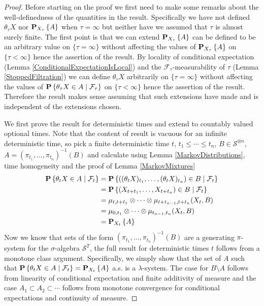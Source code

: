 \begin{proof}
Before starting on the proof we first need to make some remarks about
the well-definedness of the quantities in the result.  Specifically we
have not defined $\theta_\tau X$ nor $\sprobability{A}{X_\tau}$ when $\tau = \infty$ but neither have
we assumed that $\tau$ is almost surely finite.  The first point is that we
can extend $\sprobability{A}{X_\tau}$ can be defined to be an
arbitrary value on $\lbrace \tau = \infty \rbrace$ without affecting
the values of $\sprobability{A}{X_\tau}$ on $\lbrace \tau < \infty
\rbrace$ hence the assertion of the result.  By locality of
conditional expectation (Lemma \ref{ConditionalExpectationIsLocal})
and the $\mathcal{F}_\tau$-measurability of
$\tau$ (Lemma
\ref{StoppedFiltration}) we can define $\theta_\tau X$ arbitrarily on $\lbrace \tau =
\infty \rbrace$ without affecting the values of
$\cprobability{\mathcal{F}_\tau}{\theta_\tau X \in A}$ on $\lbrace \tau < \infty
\rbrace$ hence the assertion of the result.  Therefore the result
makes sense assuming that such extensions have made and is independent
of the extensions chosen.

We first prove the result for deterministic times and extend to
countably valued optional times.  Note that the content of result is
vacuous for an infinite deterministic time, so pick a finite
deterministic time $t$, $t_1
\leq \cdots \leq t_n$, $B \in \mathcal{S}^{\otimes n}$, $A =
(\pi_{t_1}, \dotsc, \pi_{t_n})^{-1}(B)$ and
calculate using Lemma \ref{MarkovDistributions}, time homogeneity and
the proof of Lemma \ref{MarkovMixtures}
\begin{align*}
\cprobability{\mathcal{F}_t}{\theta_t X \in A} &=
\cprobability{\mathcal{F}_t}{((\theta_t X)_{t_1}, \dotsc,
  (\theta_t X)_{t_n}) \in B} \\
&= \cprobability{\mathcal{F}_t}{(X_{t  + t_1}, \dotsc, X_{t+ t_n}) \in B} \\
&= \mu_{t, t + t_1} \otimes \cdots \otimes \mu_{t+t_{n-1}, t+t_n}(X_t,B) \\
&=\mu_{0, t_1} \otimes \cdots \otimes \mu_{t_{n-1}, t_n}(X_t, B) \\
&= \sprobability {A}{X_t}
\end{align*}
Now we know that sets of the form 
$(\pi_{t_1}, \dotsc, \pi_{t_n})^{-1}(B)$ are a
generating $\pi$-system for the $\sigma$-algebra $\mathcal{S}^T$,
the full result for deterministic times $t$ follows from a monotone
class argument.  Specifically, we simply show that the set of $A$ such that
$\cprobability{\mathcal{F}_t}{\theta_t X \in A} =
\sprobability{A}{X_t}$ a.s. is a $\lambda$-system.  The case for $B
\setminus A$ follows from linearity of conditional expectation and
finite additivity of measure and the case $A_1 \subset A_2 \subset
\cdots$ follows from monotone convergence for conditional expectations
and continuity of measure.


\end{proof}

